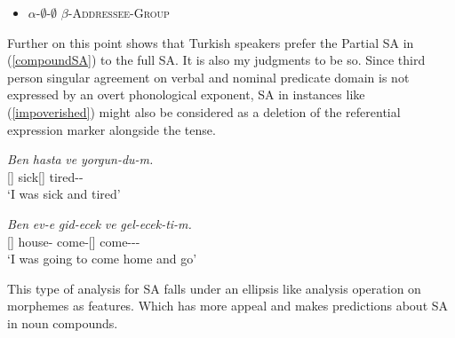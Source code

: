 \begin{itemize}
    \item $\alpha$-$\emptyset$-$\emptyset$ {\And} $\beta$-{\textsc{Addressee}-\textsc{Group}}
\end{itemize}

Further on this point \cite{kharytonava2012word} shows that Turkish speakers prefer the Partial SA in (\ref{compoundSA}) to the full SA. It is also my judgments to be so. Since third person singular agreement on verbal and nominal predicate domain is not expressed by an overt phonological exponent, SA in instances like (\ref{impoverished}) might also be considered as a deletion of the referential expression marker alongside the tense.

\begin{exe}
    \ex \label{impoverished}
    \begin{xlist}
        \ex \gll 
        \textit{Ben} \textit{hasta} \textit{ve} \textit{yorgun-du-m.} \\ {\First}{\Sg}[{\Nom}] sick[{\Third}{\Sg}] {\And} tired-{\Pst}-{\First}{\Sg} \\
        \glt `I was sick and tired'
        
        \ex \gll
        \textit{Ben} \textit{ev-e} \textit{gid-ecek} \textit{ve} \textit{gel-ecek-ti-m.} \\ {\First}{\Sg}[{\Nom}] house-{\Dat} come-{\Fut}[{\Third}{\Sg}] {\And} come-{\Fut}-{\Pst}-{\First}{\Sg} \\
        \glt `I was going to come home and go'
    \end{xlist}
\end{exe}

This type of analysis for SA falls under an ellipsis like analysis operation on morphemes as features. Which has more appeal and makes predictions about SA in noun compounds.